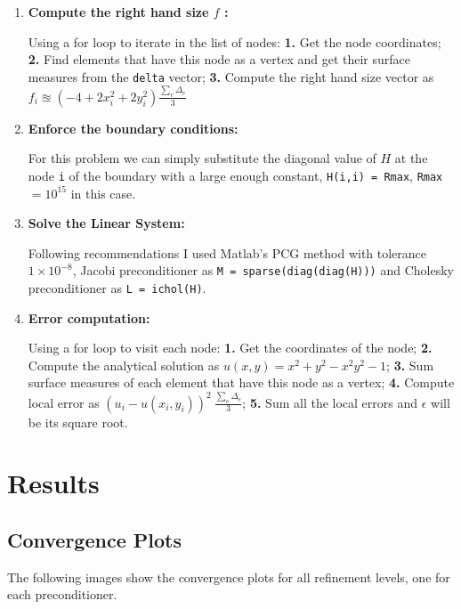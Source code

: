 \documentclass[a4paper, 11pt]{article}
\begin{document}
\begin{enumerate}
				\item  \textbf{Compute the right hand size $f$ :}
				
					Using a for loop to iterate in the list of nodes:
					\subitem \textbf{1.} Get the node coordinates;
					\subitem \textbf{2.} Find elements that have this node as a vertex and get their surface measures from the \texttt{delta} vector;
					\subitem \textbf{3.} Compute the right hand size vector as $f_i \approxeq (-4 +2x_i^2 + 2y_i^2)  \frac{\sum_e \Delta_e}{3} $
				
				\item \textbf{Enforce the boundary conditions:}
				
					For this problem we can simply substitute the diagonal value of $ H $ at the node \texttt{i} of the boundary with a large enough constant, \texttt{H(i,i) = Rmax}, \texttt{Rmax} $= 10^{15} $ in this case.
					
				
				\item \textbf{Solve the Linear System:}
				
					Following recommendations I used Matlab's PCG method with tolerance $ 1 \times 10^{-8} $, Jacobi preconditioner as \texttt{M = sparse(diag(diag(H)))} and Cholesky preconditioner as \texttt{L = ichol(H)}.
				
				\item \textbf{Error computation:}
				
					 Using a for loop to visit each node:
					\subitem \textbf{1.} Get the coordinates of the node;
					\subitem \textbf{2.} Compute the analytical solution as $u(x,y) = x^2 + y^2 - x^2y^2 - 1$;
					\subitem \textbf{3.} Sum surface measures of each element that have this node as a vertex;
					\subitem \textbf{4.} Compute local error as $ (u_i - u(x_i,y_i))^ 2 \ \frac{\sum_e \Delta_e}{3} $;
					\subitem \textbf{5.} Sum all the local errors and $ \epsilon $ will be its square root.	
			\end{enumerate}
			
					
		\section{Results}
		
			\subsection{Convergence Plots}
			
				The following images show the convergence plots for all refinement levels, one for each preconditioner.
				
\end{document}
